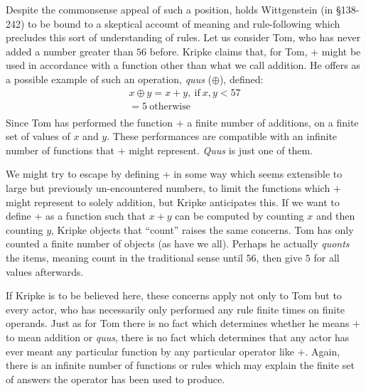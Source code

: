 \documentclass[doc,12pt,apacite,biblatex]{apa6}
\begin{document}
Despite the commonsense appeal of such a position,  holds
Wittgenstein (in \S 138-242) to be bound to a skeptical account of meaning and
rule-following which precludes this sort of understanding of rules. Let us
consider Tom, who has never added a number greater than $56$ before. Kripke
claims that, for Tom, $+$ might be used in accordance with a function other
than what we call addition. He offers as a possible example of such an
operation, \emph{quus} ($\oplus$), defined:
\begin{equation}
\begin{split}
		x \oplus y = x + y,~\mathrm{if}~x,y <57\\
		=5~\mathrm{otherwise} \\
\end{split}
\end{equation}
Since Tom has performed the function $+$ a finite number of additions, on a
finite set of values of $x$ and $y$. These performances are compatible with an
infinite number of functions that $+$ might represent. \emph{Quus} is just one
of them.

We might try to escape by defining $+$ in some way which seems extensible to
large but previously un-encountered numbers, to limit the functions which $+$
might represent to solely addition, but Kripke anticipates this. If we want to
define $+$ as a function such that $x + y$ can be computed by counting $x$ and
then counting $y$, Kripke objects that	``count'' raises the same concerns. Tom
has only counted a finite number of objects (as have we all). Perhaps he
actually \emph{quonts} the items, meaning count in the traditional sense until
$56$, then give $5$ for all values afterwards.

If Kripke is to be believed here, these concerns apply not only to Tom but to
every actor, who has necessarily only performed any rule finite times on finite
operands. Just as for Tom there is no fact which determines whether he means
$+$ to mean addition or \emph{quus}, there is no fact which determines that any
actor has ever meant any particular function by any particular operator like
$+$. Again, there is an infinite number of functions or rules which may explain
the finite set of answers the operator has been used to produce.
\end{document}
